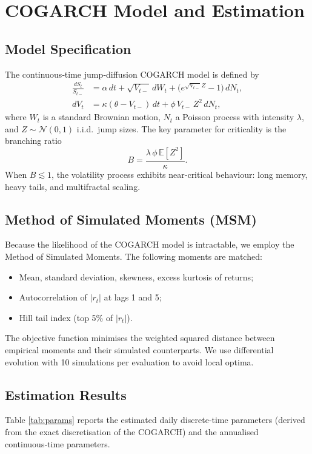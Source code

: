 \chapter{COGARCH Model and Estimation}

\section{Model Specification}
The continuous‑time jump‑diffusion COGARCH model \cite{kluppelberg2004continuous} is defined by
\begin{align}
\frac{dS_t}{S_{t-}} &= \alpha\,dt + \sqrt{V_{t-}}\,dW_t + \bigl(e^{\sqrt{V_{t-}}Z} - 1\bigr)\,dN_t , \label{eq:price_sde}\\
dV_t &= \kappa(\theta - V_{t-})\,dt + \phi\, V_{t-}\,Z^2\,dN_t , \label{eq:var_sde}
\end{align}
where $W_t$ is a standard Brownian motion, $N_t$ a Poisson process with intensity $\lambda$, and $Z\sim\mathcal{N}(0,1)$ i.i.d.\ jump sizes. The key parameter for criticality is the branching ratio
\begin{equation}
B = \frac{\lambda\,\phi\,\mathbb{E}[Z^2]}{\kappa}. \label{eq:B}
\end{equation}
When $B \lesssim 1$, the volatility process exhibits near‑critical behaviour: long memory, heavy tails, and multifractal scaling.

\section{Method of Simulated Moments (MSM)}
Because the likelihood of the COGARCH model is intractable, we employ the Method of Simulated Moments. The following moments are matched:
\begin{itemize}
    \item Mean, standard deviation, skewness, excess kurtosis of returns;
    \item Autocorrelation of $|r_t|$ at lags 1 and 5;
    \item Hill tail index (top 5\% of $|r_t|$).
\end{itemize}
The objective function minimises the weighted squared distance between empirical moments and their simulated counterparts. We use differential evolution with 10 simulations per evaluation to avoid local optima.

\section{Estimation Results}
Table \ref{tab:params} reports the estimated daily discrete‑time parameters (derived from the exact discretisation of the COGARCH) and the annualised continuous‑time parameters.

